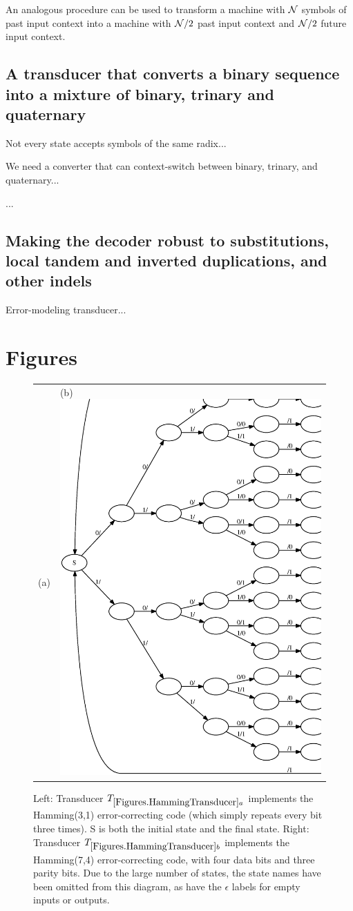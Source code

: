 \documentclass[english]{article}
\begin{document}
An analogous procedure can be used to transform a machine with ${\cal N}$ symbols of past input context
into a machine with ${\cal N}/2$ past input context and ${\cal N}/2$ future input context.


\subsection{A transducer that converts a binary sequence into a mixture of binary, trinary and quaternary}

Not every state accepts symbols of the same radix...

We need a converter that can context-switch between binary, trinary, and quaternary...

...

\subsection{Making the decoder robust to substitutions, local tandem and inverted duplications, and other indels}

Error-modeling transducer...


\newpage
\section{Figures}

\newpage
\begin{figure}
\begin{tabular}{ll}
(a) {hamming31}{width=.45\textwidth}
&
(b) \includegraphics[width=.45\textwidth]{hamming74.ps}
\end{tabular}
\caption{ 
  Left:
Transducer $\hammingthreeone$ implements the Hamming(3,1) error-correcting code
(which simply repeats every bit three times).
S is both the initial state and the final state.
Right:
Transducer $\hammingsevenfour$ implements the Hamming(7,4) error-correcting code,
with four data bits and three parity bits.
Due to the large number of states, the state names have been omitted from this diagram,
as have the $\epsilon$ labels for empty inputs or outputs.
}
\end{figure}
\end{document}

